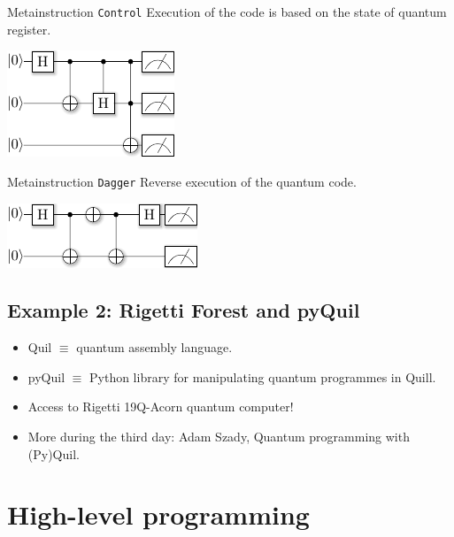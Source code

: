 \documentclass[a4paper,11pt]{article}
\begin{document}
{Metainstruction \texttt{Control}}
Execution of the code is based on the state of quantum register.


\begin{center}
\includegraphics[scale=1.5]{../slides/pics/meta_control_circ.pdf}
\end{center}



{Metainstruction \texttt{Dagger}}
Reverse execution of the quantum code.


\begin{center}
\includegraphics[scale=1.5]{../slides/pics/meta_dagger_circ.pdf}
\end{center}


\subsection{Example 2: Rigetti Forest and pyQuil}


\begin{itemize}
\item Quil $\equiv$ quantum assembly language.
\item pyQuil $\equiv$ Python library for manipulating quantum 
programmes in Quill.
\item Access to Rigetti 19Q-Acorn quantum computer!
\item More during the third day: Adam Szady, Quantum programming 
with (Py)Quil.
\end{itemize}



\section{High-level programming}
\end{document}
